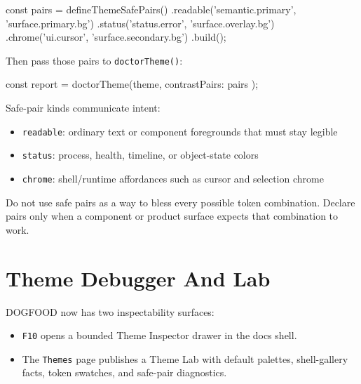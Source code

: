 \begin{CodeBlock}
const pairs = defineThemeSafePairs()
  .readable('semantic.primary', 'surface.primary.bg')
  .status('status.error', 'surface.overlay.bg')
  .chrome('ui.cursor', 'surface.secondary.bg')
  .build();
\end{CodeBlock}

Then pass those pairs to \texttt{d\allowbreak{}o\allowbreak{}c\allowbreak{}t\allowbreak{}o\allowbreak{}r\allowbreak{}T\allowbreak{}h\allowbreak{}e\allowbreak{}m\allowbreak{}e\allowbreak{}(\allowbreak{})}:

\begin{CodeBlock}
const report = doctorTheme(theme, { contrastPairs: pairs });
\end{CodeBlock}

Safe-pair kinds communicate intent:

\begin{itemize}
\tightlist
\item
  \texttt{r\allowbreak{}e\allowbreak{}a\allowbreak{}d\allowbreak{}a\allowbreak{}b\allowbreak{}l\allowbreak{}e}: ordinary text or component foregrounds that must stay legible
\item
  \texttt{s\allowbreak{}t\allowbreak{}a\allowbreak{}t\allowbreak{}u\allowbreak{}s}: process, health, timeline, or object-state colors
\item
  \texttt{c\allowbreak{}h\allowbreak{}r\allowbreak{}o\allowbreak{}m\allowbreak{}e}: shell/runtime affordances such as cursor and selection chrome
\end{itemize}

Do not use safe pairs as a way to bless every possible token combination. Declare pairs only when a component or product surface expects that combination to work.

\section{Theme Debugger And Lab}\label{record-028-theme-debugger-and-lab}

DOGFOOD now has two inspectability surfaces:

\begin{itemize}
\tightlist
\item
  \texttt{F\allowbreak{}1\allowbreak{}0} opens a bounded Theme Inspector drawer in the docs shell.
\item
  The \texttt{T\allowbreak{}h\allowbreak{}e\allowbreak{}m\allowbreak{}e\allowbreak{}s} page publishes a Theme Lab with default palettes, shell-gallery facts, token swatches, and safe-pair diagnostics.
\end{itemize}


